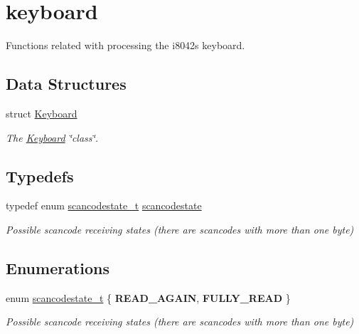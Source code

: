 \hypertarget{group__keyboard}{}\section{keyboard}
\label{group__keyboard}


Functions related with processing the i8042\textquotesingle{}s keyboard.  


\subsection*{Data Structures}
\begin{DoxyCompactItemize}
\item 
struct \hyperlink{struct_keyboard}{Keyboard}
\begin{DoxyCompactList}\small\item\em The \hyperlink{struct_keyboard}{Keyboard} \char`\"{}class\char`\"{}. \end{DoxyCompactList}\end{DoxyCompactItemize}
\subsection*{Typedefs}
\begin{DoxyCompactItemize}
\item 
\hypertarget{group__keyboard_ga0b76c3eaf709ef57eecc834107a6d8cb}{}\label{group__keyboard_ga0b76c3eaf709ef57eecc834107a6d8cb} 
typedef enum \hyperlink{group__keyboard_gac25cb6c9d28679aed197b02d5885fcc2}{scancodestate\+\_\+t} \hyperlink{group__keyboard_ga0b76c3eaf709ef57eecc834107a6d8cb}{scancodestate}
\begin{DoxyCompactList}\small\item\em Possible scancode receiving states (there are scancodes with more than one byte) \end{DoxyCompactList}\end{DoxyCompactItemize}
\subsection*{Enumerations}
\begin{DoxyCompactItemize}
\item 
\hypertarget{group__keyboard_gac25cb6c9d28679aed197b02d5885fcc2}{}\label{group__keyboard_gac25cb6c9d28679aed197b02d5885fcc2} 
enum \hyperlink{group__keyboard_gac25cb6c9d28679aed197b02d5885fcc2}{scancodestate\+\_\+t} \{ {\bfseries R\+E\+A\+D\+\_\+\+A\+G\+A\+IN}, 
{\bfseries F\+U\+L\+L\+Y\+\_\+\+R\+E\+AD}
 \}\begin{DoxyCompactList}\small\item\em Possible scancode receiving states (there are scancodes with more than one byte) \end{DoxyCompactList}
\end{DoxyCompactItemize}
